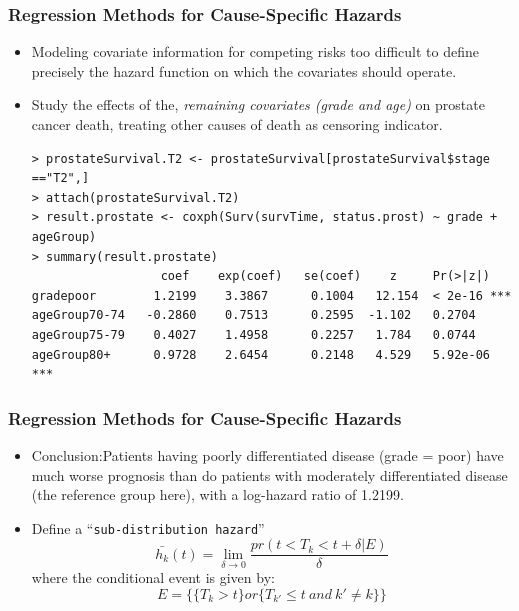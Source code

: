 \documentclass{beamer}
\newcommand{\empr}[1]{{\emph{\color{red}#1}}}
\begin{document}
\pagebreak
\begin{frame}[fragile]
\frametitle{Regression Methods for Cause-Specific Hazards}
\begin{itemize}
\item Modeling covariate information for competing risks too difficult to define precisely the hazard function on which the covariates should operate.
\item  Study the effects of the, \empr{remaining covariates (grade and age)} on prostate cancer death, treating other causes of death as censoring indicator.
\begin{Verbatim}
> prostateSurvival.T2 <- prostateSurvival[prostateSurvival$stage 
=="T2",]
> attach(prostateSurvival.T2)  
> result.prostate <- coxph(Surv(survTime, status.prost) ~ grade +
ageGroup)
> summary(result.prostate)
                  coef    exp(coef)   se(coef)    z     Pr(>|z|) 
gradepoor        1.2199    3.3867      0.1004   12.154  < 2e-16 ***
ageGroup70-74   -0.2860    0.7513      0.2595  -1.102   0.2704
ageGroup75-79    0.4027    1.4958      0.2257   1.784   0.0744 
ageGroup80+      0.9728    2.6454      0.2148   4.529   5.92e-06 ***
\end{Verbatim}    
\end{itemize}
\end{frame}


\pagebreak
\begin{frame}
\frametitle{Regression Methods for Cause-Specific Hazards}
\begin{itemize}
\item Conclusion:Patients having poorly differentiated disease (grade = poor) have much worse prognosis than do patients with moderately differentiated disease (the reference group here), with a log-hazard ratio of 1.2199.
\item Define a ``\texttt{sub-distribution hazard}''
\begin{equation}
\bar{h_k}(t) =  \lim\limits_{\delta \to 0} \frac{pr(t<T_k<t+\delta|E)}{\delta}
\end{equation}
where the conditional event is given by:
\begin{equation}
E = \big\lbrace \lbrace T_k >t \rbrace or \lbrace T_{k'} \le t \ and\ k' \neq k \rbrace \big\rbrace
\end{equation}
\end{itemize}
\end{frame}
\end{document}
